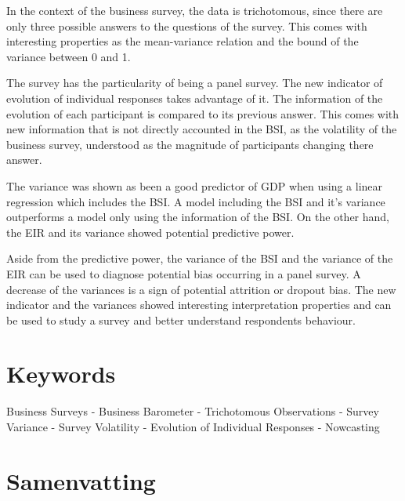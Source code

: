 \documentclass[12pt,a4paper,oneside]{book}
\begin{document}


In the context of the business survey, the data is trichotomous, since there are only three possible answers to the questions of the survey. 
This comes with interesting properties as the mean-variance relation
and the bound of the variance between 0 and 1.

The survey has the particularity of being a panel survey. The new indicator of evolution of individual responses takes advantage of it. The information of the evolution of each participant is compared to its previous answer.
This comes with new information that is not directly accounted in the BSI, as the volatility of the business survey, understood as the magnitude of participants changing there answer.
 

The variance was shown as been a good predictor of GDP when using a linear regression which includes the BSI. A model including the BSI and it's variance outperforms a model only using the information of the BSI.
On the other hand, the EIR and its variance showed potential predictive power.

Aside from the predictive power, the variance of the BSI and the variance of the EIR can be used to diagnose potential bias occurring in a panel survey. A decrease of the variances is a sign of potential attrition or dropout bias.
The new indicator and the variances showed interesting interpretation properties and can be used to study a survey and better understand respondents behaviour.

\section*{Keywords}
Business Surveys - 
Business Barometer -
Trichotomous Observations -
Survey Variance - 
Survey Volatility -
Evolution of Individual Responses -
Nowcasting

\section*{Samenvatting}
\end{document}
